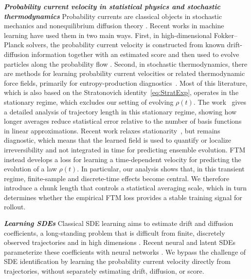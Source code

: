 \documentclass[oneside,11pt]{article}
\theoremstyle{remark}
\begin{document}
\textbf{\emph{Probability current velocity in statistical physics and stochastic thermodynamics}}
Probability currents are classical objects in stochastic mechanics and nonequilibrium diffusion theory
\cite{nelson:1967,chetrite-gawedzki:2009,peliti-muratore-ginanneschi:2023}. 
Recent works in machine learning have used them in two main ways. First, in high-dimensional Fokker--Planck solvers, the probability current velocity is constructed from known drift-diffusion information together with an estimated score
and then used to evolve particles along the probability flow
\cite{maoutsa-reich-opper:2020,boffi-vanden-eijnden:2023,boffi-vanden-eijnden:2024}.
Second, in stochastic thermodynamics, there are methods for learning probability current velocities or related thermodynamic force fields, primarily for entropy-production diagnostics~\cite{seifert:2012,li2019quantifying,frishman-ronceray:2020,boffi-vanden-eijnden:2025,lyu-ray-crutchfield:2025,das2025localizing}. Most of this literature, which is also based on the Stratonovich identity~\eqref{eq:StratExp}, operates in the stationary regime, which excludes our setting of evolving $\rho(t)$. The work~\cite{frishman-ronceray:2020} gives a detailed analysis of trajectory length in this stationary regime, showing how longer averages reduce statistical error relative to the number of basis functions in linear approximations.  Recent work relaxes stationarity~\cite{lyu-ray-crutchfield:2025,das2025localizing}, but remains diagnostic, which means that the learned field is used to quantify or localize irreversibility and not integrated in time for predicting ensemble evolution. FTM instead develops a loss for learning a time-dependent velocity for predicting the evolution of a law $\rho(t)$. In particular, our analysis shows that, in this transient regime, finite-sample and discrete-time effects become central. We therefore introduce a chunk length that controls a statistical averaging scale, which in turn determines whether the empirical FTM loss provides a stable training signal for rollout.









\textbf{\emph{Learning SDEs}}
Classical SDE learning aims to estimate drift and diffusion coefficients, a long-standing problem that is difficult from finite, discretely observed trajectories and in high dimensions
\cite{nielsen-madsen-young:2000,comte-genon-catalot:2020,boninsegna-nueske-clementi:2018,ryder2018blackbox}.
Recent neural and latent SDEs parameterize these coefficients with neural networks 
\cite{tzen2019neural,li2020scalable,kidger2021efficient,course2023amortized,zhang2024trajectory,bartosh2025sdematching}. We
bypass the challenge of SDE identification by learning the probability current velocity directly from trajectories, without separately estimating drift, diffusion, or score.
\end{document}
